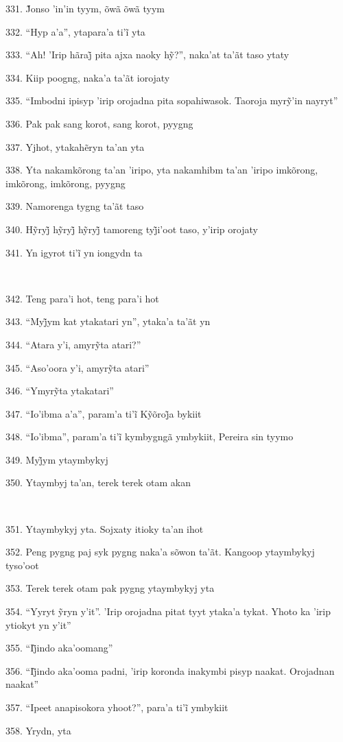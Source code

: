 331. J̃onso ’in’in tyym, õwã õwã tyym

332. ``Hyp a’a'', ytapara’a ti’ĩ yta

333. ``Ah! ’Irip hãraj̃ pita ajxa naoky hỹ?'', naka’at ta’ãt taso ytaty

334. Kiip poogng, naka'a ta'ãt iorojaty

335. ``Imbodni ipisyp ’irip orojadna pita sopahiwasok. Taoroja myrỹ’in nayryt''

336. Pak pak sang korot, sang korot, pyygng

337. Yjhot, ytakahẽryn ta’an yta

338. Yta nakamkõrong ta'an 'iripo, yta nakamhibm ta'an 'iripo imkõrong,
imkõrong, imkõrong, pyygng

339. Namorenga tygng ta'ãt taso

340. Hỹryj̃ hỹryj̃ hỹryj̃ tamoreng tyj̃i’oot taso, y’irip orojaty

341. Yn igyrot ti’ĩ yn iongydn ta

~

342. Teng para'i hot, teng para'i hot

343. ``Myj̃ym kat ytakatari yn'', ytaka’a ta’ãt yn

344. ``Atara y’i, amyrỹta atari?''

345. ``Aso’oora y’i, amyrỹta atari''

346. ``Ymyrỹta ytakatari''

347. ``Io’ibma a’a'', param’a ti’ĩ Kỹõroj̃a bykiit

348. ``Io’ibma'', param’a ti’ĩ kymbygngã ymbykiit, Pereira sin tyymo

349. Myj̃ym ytaymbykyj

350. Ytaymbyj ta'an, terek terek otam akan

~

351. Ytaymbykyj yta. Sojxaty itioky ta'an ihot

352. Peng pygng paj syk pygng naka'a sõwon ta'ãt. Kangoop ytaymbykyj tyso'oot

353. Terek terek otam pak pygng ytaymbykyj yta

354. ``Yyryt ỹryn y’it''. ’Irip orojadna pitat tyyt ytaka’a tykat. Yhoto ka ’irip ytiokyt yn y’it''

355. ``Ij̃indo aka’oomang''

356. ``Ij̃indo aka’ooma padni, ’irip koronda inakymbi pisyp naakat. Orojadnan naakat''

357. ``Ipeet anapisokora yhoot?'', para’a ti’ĩ ymbykiit

358. Yrydn, yta

